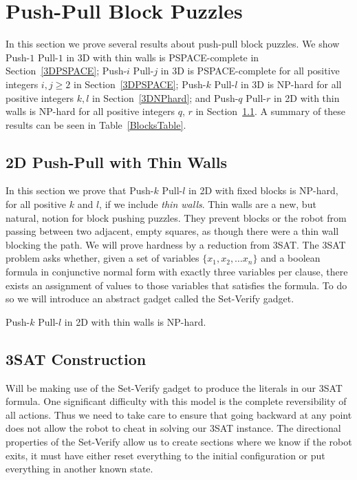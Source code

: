 
\section{Push-Pull Block Puzzles}
In this section we prove several results about push-pull block puzzles. We show Push-$1$ Pull-$1$ in 3D with thin walls is PSPACE-complete in Section~\ref{3DPSPACE}; Push-$i$ Pull-$j$ in 3D is PSPACE-complete for all positive integers $i,j \geq 2$ in Section~\ref{3DPSPACE}; Push-$k$ Pull-$l$ in 3D is NP-hard for all positive integers $k, l$ in Section~\ref{3DNPhard}; and Push-$q$ Pull-$r$ in 2D with thin walls is NP-hard for all positive integers $q$, $r$ in Section~\ref{2DNPhard}. A summary of these results can be seen in Table~\ref{BlocksTable}.


\subsection{2D Push-Pull with Thin Walls}
\label{2DNPhard}
In this section we prove that Push-$k$ Pull-$l$ in 2D with fixed blocks is NP-hard, for all positive $k$ and $l$, if we include \emph{thin walls}. Thin walls are a new, but natural, notion for block pushing puzzles. They prevent blocks or the robot from passing between two adjacent, empty squares, as though there were a thin wall blocking the path. We will prove hardness by a reduction from 3SAT. The 3SAT problem asks whether, given a set of variables $\{x_1, x_2, \ldots x_n\}$ and a boolean formula in conjunctive normal form with exactly three variables per clause, there exists an assignment of values to those variables that satisfies the formula.\cite{NPBook} To do so we will introduce an abstract gadget called the Set-Verify gadget.

\begin{theorem}
\label{thm:2DNPhard}
Push-$k$ Pull-$l$ in 2D with thin walls is NP-hard.
\end{theorem}

\subsection{3SAT Construction}
\label{sec:2DPushPull3SAT}

Will be making use of the Set-Verify gadget to produce the literals in our 3SAT formula. One significant difficulty with this model is the complete reversibility of all actions. Thus we need to take care to ensure that going backward at any point does not allow the robot to cheat in solving our 3SAT instance. The directional properties of the Set-Verify allow us to create sections where we know if the robot exits, it must have either reset everything to the initial configuration or put everything in another known state.

